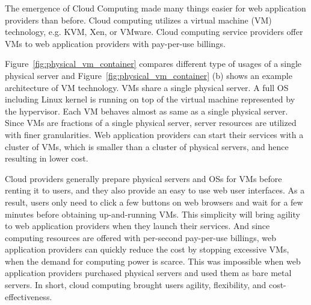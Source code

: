 The emergence of Cloud Computing made many things easier for web application providers than before.
Cloud computing utilizes a virtual machine (VM) technology, e.g. KVM, Xen, or VMware.
Cloud computing service providers offer VMs to web application providers with pay-per-use billings.

Figure~\ref{fig:physical_vm_container} compares different type of usages of a single physical server and Figure~\ref{fig:physical_vm_container} (b) shows an example architecture of VM technology.
VMs share a single physical server.
A full OS including Linux kernel is running on top of the virtual machine represented by the hypervisor.
Each VM behaves almost as same as a single physical server.
Since VMs are fractions of a single physical server, server resources are utilized with finer granularities.
Web application providers can start their services with a cluster of VMs, which is smaller than a cluster of physical servers, and hence resulting in lower cost.

Cloud providers generally prepare physical servers and OSs for VMs before renting it to users, and they also provide an easy to use web user interfaces.
As a result, users only need to click a few buttons on web browsers and wait for a few minutes before obtaining up-and-running VMs.
This simplicity will bring agility to web application providers when they launch their services.
And since computing resources are offered with per-second pay-per-use billings, web application providers can quickly reduce the cost by stopping excessive VMs, when the demand for computing power is scarce.
This was impossible when web application providers purchased physical servers and used them as bare metal servers.
In short, cloud computing brought users agility, flexibility, and cost-effectiveness.

